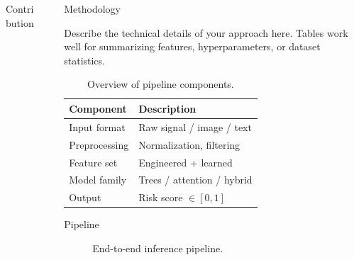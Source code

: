 \documentclass[final]{beamer}
\newlength{\sepwidth}
\newlength{\colwidth}
\newcommand{\separatorcolumn}{\begin{column}{\sepwidth}\end{column}}
\begin{document}
\begin{frame}[t]
\begin{columns}[t]
\begin{column}{\colwidth}
\begin{alertblock}{Contribution}
  \end{alertblock}

\end{column}

\separatorcolumn

\begin{column}{\colwidth}

  \begin{block}{Methodology}

    Describe the technical details of your approach here.
    Tables work well for summarizing features, hyperparameters,
    or dataset statistics.

    \begin{table}
      \centering
      \small
      \begin{tabular}{l l}
        \toprule
        \textbf{Component} & \textbf{Description} \\
        \midrule
        Input format      & Raw signal / image / text \\
        Preprocessing     & Normalization, filtering \\
        Feature set       & Engineered + learned \\
        Model family      & Trees / attention / hybrid \\
        Output            & Risk score $\in [0,1]$ \\
        \bottomrule
      \end{tabular}
      \caption{Overview of pipeline components.}
    \end{table}

  \end{block}

  \begin{block}{Pipeline}

    \begin{figure}
      \centering
      \caption{End-to-end inference pipeline.}
    \end{figure}


\end{block}
\end{column}
\end{columns}
\end{frame}
\end{document}
